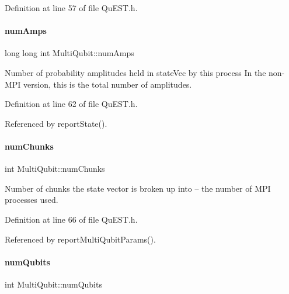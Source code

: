 Definition at line 57 of file Qu\+E\+S\+T.\+h.

\mbox{\label{structMultiQubit_ae16f47d8b725c914fb7f66b6498d79db}} 
\paragraph{\texorpdfstring{num\+Amps}{numAmps}}
{\footnotesize\ttfamily long long int Multi\+Qubit\+::num\+Amps}



Number of probability amplitudes held in state\+Vec by this process In the non-\/\+M\+PI version, this is the total number of amplitudes. 



Definition at line 62 of file Qu\+E\+S\+T.\+h.



Referenced by report\+State().

\mbox{\label{structMultiQubit_acd43f2f57991709c9e94f73662c972b2}} 
\paragraph{\texorpdfstring{num\+Chunks}{numChunks}}
{\footnotesize\ttfamily int Multi\+Qubit\+::num\+Chunks}



Number of chunks the state vector is broken up into -- the number of M\+PI processes used. 



Definition at line 66 of file Qu\+E\+S\+T.\+h.



Referenced by report\+Multi\+Qubit\+Params().

\mbox{\label{structMultiQubit_ab5b9795bdc6fb5855e1974dcbbaeb36f}} 
\paragraph{\texorpdfstring{num\+Qubits}{numQubits}}
{\footnotesize\ttfamily int Multi\+Qubit\+::num\+Qubits}



